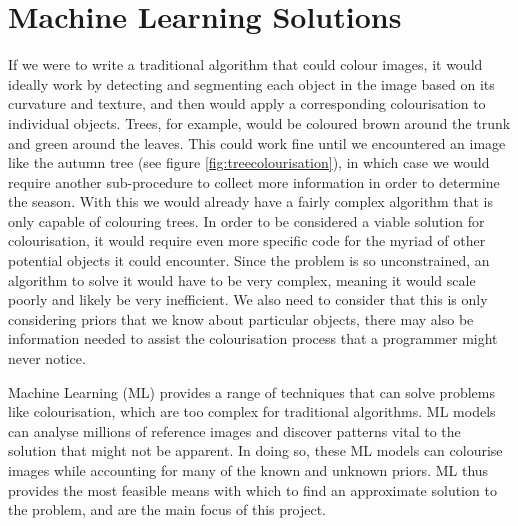 \documentclass{l4proj}
\begin{document}
\section{Machine Learning Solutions}
If we were to write a traditional algorithm that could colour images, it would ideally work by detecting and segmenting each object in the image based on its curvature and texture, and then would apply a corresponding colourisation to individual objects. Trees, for example, would be coloured brown around the trunk and green around the leaves. This could work fine until we encountered an image like the autumn tree (see figure \ref{fig:treecolourisation}), in which case we would require another sub-procedure to collect more information in order to determine the season. With this we would already have a fairly complex algorithm that is only capable of colouring trees. In order to be considered a viable solution for colourisation, it would require even more specific code for the myriad of other potential objects it could encounter. Since the problem is so unconstrained, an algorithm to solve it would have to be very complex, meaning it would scale poorly and likely be very inefficient. We also need to consider that this is only considering priors that we know about particular objects, there may also be information needed to assist the colourisation process that a programmer might never notice.

Machine Learning (ML) provides a range of techniques that can solve problems like colourisation, which are too complex for traditional algorithms. ML models can analyse millions of reference images and discover patterns vital to the solution that might not be apparent. In doing so, these ML models can colourise images while accounting for many of the known and unknown priors. ML thus provides the most feasible means with which to find an approximate solution to the problem, and are the main focus of this project. 

\end{document}
